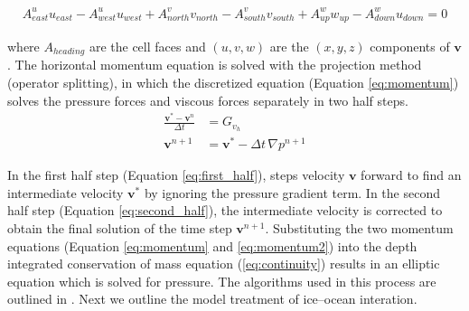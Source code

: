 \begin{align}
    A^u_{east} u_{east} - A^u_{west} u_{west}+A^v_{north} v_{north}-A^v_{south} v_{south}+A^w_{up} w_{up}-A^w_{down} u_{down} = 0
\end{align}

where $A_{heading}$ are the cell faces and $(u, v, w)$ are the $(x,y,z)$ components of $\mathbf{v}$. The horizontal momentum equation is solved with the projection method (operator splitting), in which the discretized equation  (Equation \ref{eq:momentum}) solves the pressure forces and viscous forces separately in two half steps. 
\begin{align}
    {\frac  {{\mathbf  {v}}^{*}-{\mathbf  {v}}^{n}}{\Delta t}}&= G_{v_h}  \label{eq:first_half}\\
    {\mathbf  {v}}^{{n+1}}&={\mathbf  {v}}^{*}-{\Delta t}\,\nabla p^{{n+1}} \label{eq:second_half}
\end{align}

In the first half step (Equation \ref{eq:first_half}), steps velocity $\mathbf{v}$ forward to find an intermediate velocity $\mathbf{v}^{*}$ by ignoring the pressure gradient term. In the second half step (Equation \ref{eq:second_half}), the intermediate velocity is corrected to obtain the final solution of the time step ${ \mathbf {v} ^{n+1}}$.
Substituting the two momentum equations (Equation \ref{eq:momentum} and \ref{eq:momentum2}) into the depth integrated conservation of mass equation (\ref{eq:continuity}) results in an elliptic equation which is solved for pressure. The algorithms used in this process are outlined in \citep{marshall1997finite,marshall1997hydrostatic}. Next we outline the model treatment of ice--ocean interation.


